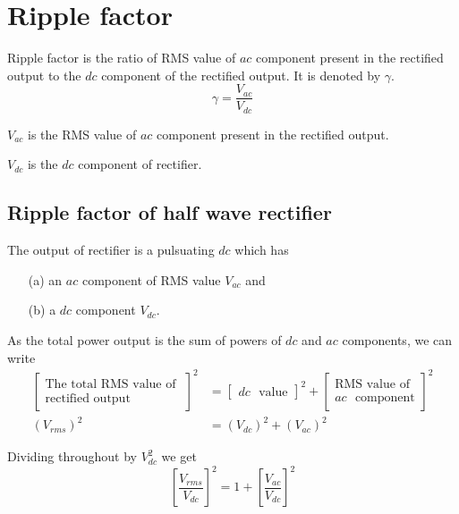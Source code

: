 \eject

\section{Ripple factor}\label{sec2.6}

Ripple factor is the ratio of RMS value of $ac$ component present in
the rectified output to the $dc$ component of the rectified output. It
is denoted by $\gamma$.
\begin{equation}
\gamma = \frac{V_{ac}}{V_{dc}} \label{eq2.22}
\end{equation}

$V_{ac}$ is the RMS value of $ac$ component present in the rectified
output.

$V_{dc}$ is the $dc$ component of rectifier.

\subsection{Ripple factor of half wave rectifier}\label{subsec2.6.1}

The output of rectifier is a pulsuating $dc$ which has 
\begin{itemize}
\item[(a)] an $ac$ component of RMS value $V_{ac}$ and

\item[(b)] a $dc$ component $V_{dc}$.
\end{itemize}

As the total power output is the sum of powers of $dc$ and $ac$
components, we can write
\begin{align*}
\begin{bmatrix}
\text{The total RMS value of }\\
\text{rectified output}
\end{bmatrix}^2 & = 
\begin{bmatrix}
dc \text{~ value}
\end{bmatrix}^2 + 
\begin{bmatrix}
\text{RMS value of}\\
ac \text{~ component}
\end{bmatrix}^2\\
(V_{rms})^2 & = (V_{dc})^2 + (V_{ac})^2
\end{align*}
 
Dividing throughout by $V^2_{dc}$ we get
\begin{equation}
\left[
\frac{V_{rms}}{V_{dc}} 
\right]^2 = 1 + 
\left[
\frac{V_{ac}}{V_{dc}}
\right]^2
\label{eq2.23}
\end{equation}

